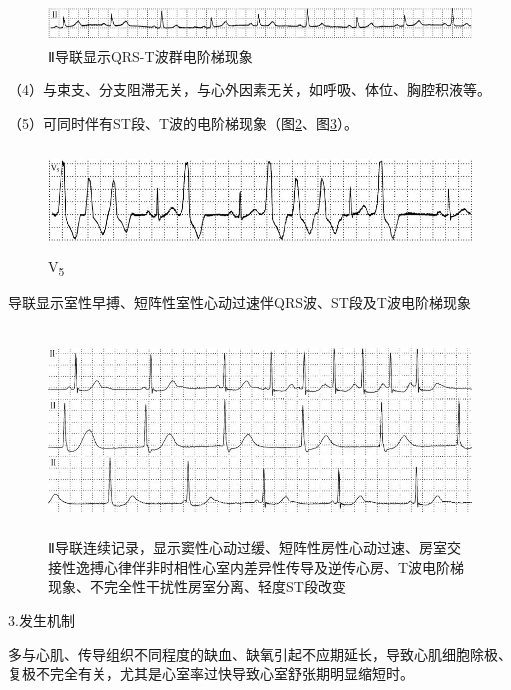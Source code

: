 \begin{figure}[!htbp]
 \centering
 \includegraphics[width=5.625in,height=0.39583in]{./images/Image00656.jpg}
 \captionsetup{justification=centering}
 \caption{Ⅱ导联显示QRS-T波群电阶梯现象}
 \label{fig39-7}
  \end{figure} 

（4）与束支、分支阻滞无关，与心外因素无关，如呼吸、体位、胸腔积液等。

（5）可同时伴有ST段、T波的电阶梯现象（图\ref{fig39-8}、图\ref{fig39-9}）。

\begin{figure}[!htbp]
 \centering
 \includegraphics[width=5.65625in,height=1.09375in]{./images/Image00657.jpg}
 \captionsetup{justification=centering}
 \caption{V\textsubscript{5}}
 \label{fig39-8}
  \end{figure} 
导联显示室性早搏、短阵性室性心动过速伴QRS波、ST段及T波电阶梯现象

\begin{figure}[!htbp]
 \centering
 \includegraphics[width=5.58333in,height=2.15625in]{./images/Image00658.jpg}
 \captionsetup{justification=centering}
 \caption{Ⅱ导联连续记录，显示窦性心动过缓、短阵性房性心动过速、房室交接性逸搏心律伴非时相性心室内差异性传导及逆传心房、T波电阶梯现象、不完全性干扰性房室分离、轻度ST段改变}
 \label{fig39-9}
  \end{figure} 

3.发生机制

多与心肌、传导组织不同程度的缺血、缺氧引起不应期延长，导致心肌细胞除极、复极不完全有关，尤其是心室率过快导致心室舒张期明显缩短时。

